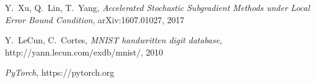 \documentclass[,conference,compsoc]{IEEEtran}
\begin{document}

%
%
%
\begin{thebibliography}{1}

Y.~Xu, Q.~Lin, T.~Yang, \emph{Accelerated Stochastic Subgradient Methods
under Local Error Bound Condition}, arXiv:1607.01027, 2017

Y.~LeCun, C.~Cortes, \emph{MNIST handwritten digit database}, http://yann.lecun.com/exdb/mnist/, 2010

\emph{PyTorch}, https://pytorch.org
\end{thebibliography}




\end{document}
